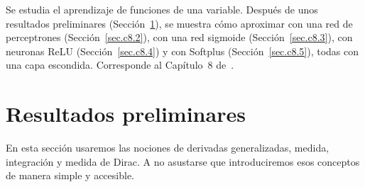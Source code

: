 \documentclass[12pt, a4paper]{amsbook}
\theoremstyle{remark}
\theoremstyle{definition}
\numberwithin{section}{chapter}
\numberwithin{subsection}{section}
\numberwithin{equation}{section}
\numberwithin{figure}{chapter}
\begin{document}
Se estudia el aprendizaje de funciones de una variable. Después de unos resultados preliminares (Sección~\ref{sec.c8.1}), se muestra cómo aproximar con una red de perceptrones (Sección~\ref{sec.c8.2}), con una red sigmoide (Sección~\ref{sec.c8.3}), con neuronas ReLU (Sección~\ref{sec.c8.4}) y con Softplus (Sección~\ref{sec.c8.5}), todas con una capa escondida. Corresponde al Capítulo~8 de~\cite{Calin}.

\section{Resultados preliminares}\label{sec.c8.1}

En esta sección usaremos las nociones de derivadas generalizadas, medida, integración y medida de Dirac. A no asustarse que introduciremos esos conceptos de manera simple y accesible.
\end{document}
